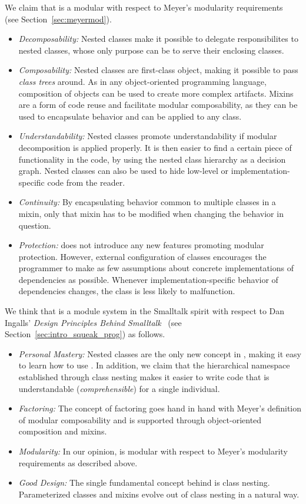 We claim that \msname is a modular with respect to Meyer's modularity requirements~\cite{myers1978composite} (see Section~\ref{sec:meyermod}).
\begin{itemize}
	\item \emph{Decomposability:} Nested classes make it possible to delegate responsibilites to nested classes, whose only purpose can be to serve their enclosing classes.
	\item \emph{Composability:} Nested classes are first-class object, making it possible to pass \emph{class trees} around. As in any object-oriented programming language, composition of objects can be used to create more complex artifacts. Mixins are a form of code reuse and facilitate modular composability, as they can be used to encapsulate  behavior and can be applied to any class.
	\item \emph{Understandability:} Nested classes promote understandability if modular decomposition is applied properly. It is then easier to find a certain piece of functionality in the code, by using the nested class hierarchy as a decision graph. Nested classes can also be used to hide low-level or implementation-specific code from the reader.
	\item \emph{Continuity:} By encapsulating behavior common to multiple classes in a mixin, only that mixin has to be modified when changing the behavior in question.
	\item \emph{Protection:} \msname does not introduce any new features promoting modular protection. However, external configuration of classes encourages the programmer to make as few assumptions about concrete implementations of dependencies as possible. Whenever implementation-specific behavior of dependencies changes, the class is less likely to malfunction.
\end{itemize}

\newpage

We think that \msname is a module system in the Smalltalk spirit with respect to Dan Ingalls' \emph{Design Principles Behind Smalltalk}~\cite{Inga81a} (see Section~\ref{sec:intro_squeak_prog}) as follows.
\begin{itemize}
	\item \emph{Personal Mastery:} Nested classes are the only new concept in \msname, making it easy to learn how to use \msname. In addition, we claim that the hierarchical namespace established through class nesting makes it easier to write code that is understandable (\emph{comprehensible}) for a single individual.
	\item \emph{Factoring:} The concept of factoring goes hand in hand with Meyer's definition of modular composability and is supported through object-oriented composition and mixins.
	\item \emph{Modularity:} In our opinion, \msname is modular with respect to Meyer's modularity requirements as described above.
	\item \emph{Good Design:} The single fundamental concept behind \msname is class nesting. Parameterized classes and mixins evolve out of class nesting in a natural way.
\end{itemize}

